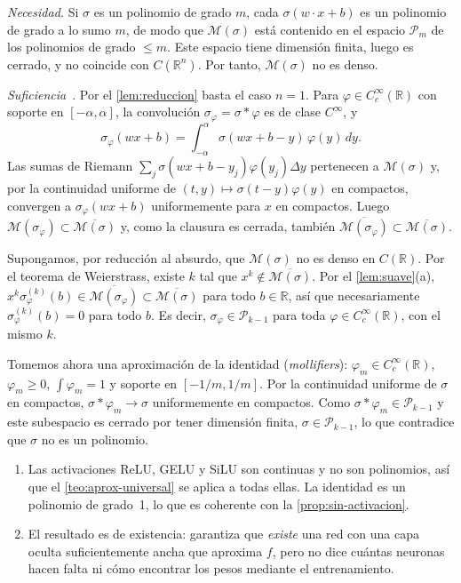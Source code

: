 \begin{demostracion}
\emph{Necesidad.} Si $\sigma$ es un polinomio de grado $m$, cada $\sigma(w\cdot x+b)$ es un polinomio de grado a lo sumo $m$, de modo que $\mathcal{M}(\sigma)$ está contenido en el espacio $\mathcal{P}_m$ de los polinomios de grado $\le m$. Este espacio tiene dimensión finita, luego es cerrado, y no coincide con $C(\mathbb{R}^n)$. Por tanto, $\mathcal{M}(\sigma)$ no es denso.

\emph{Suficiencia}~\cite[prop.~3.7]{pinkus1999approximation}. Por el \cref{lem:reduccion} basta el caso $n=1$. Para $\varphi\in C_c^\infty(\mathbb{R})$ con soporte en $[-\alpha,\alpha]$, la convolución $\sigma_\varphi = \sigma*\varphi$ es de clase $C^\infty$, y
\[
  \sigma_\varphi(wx+b) = \int_{-\alpha}^{\alpha}\sigma(wx+b-y)\,\varphi(y)\,dy.
\]
Las sumas de Riemann $\sum_j \sigma(wx+b-y_j)\varphi(y_j)\Delta y$ pertenecen a $\mathcal{M}(\sigma)$ y, por la continuidad uniforme de $(t,y)\mapsto\sigma(t-y)\varphi(y)$ en compactos, convergen a $\sigma_\varphi(wx+b)$ uniformemente para $x$ en compactos. Luego $\mathcal{M}(\sigma_\varphi)\subset\overline{\mathcal{M}(\sigma)}$ y, como la clausura es cerrada, también $\overline{\mathcal{M}(\sigma_\varphi)}\subset\overline{\mathcal{M}(\sigma)}$.

Supongamos, por reducción al absurdo, que $\mathcal{M}(\sigma)$ no es denso en $C(\mathbb{R})$. Por el teorema de Weierstrass, existe $k$ tal que $x^k\notin\overline{\mathcal{M}(\sigma)}$. Por el \cref{lem:suave}(a), $x^k\sigma_\varphi^{(k)}(b)\in\overline{\mathcal{M}(\sigma_\varphi)}\subset\overline{\mathcal{M}(\sigma)}$ para todo $b\in\mathbb{R}$, así que necesariamente $\sigma_\varphi^{(k)}(b)=0$ para todo $b$. Es decir, $\sigma_\varphi\in\mathcal{P}_{k-1}$ para toda $\varphi\in C_c^\infty(\mathbb{R})$, con el mismo $k$.

Tomemos ahora una aproximación de la identidad (\emph{mollifiers}): $\varphi_m\in C_c^\infty(\mathbb{R})$, $\varphi_m\ge 0$, $\int\varphi_m=1$ y soporte en $[-1/m,1/m]$. Por la continuidad uniforme de $\sigma$ en compactos, $\sigma*\varphi_m\to\sigma$ uniformemente en compactos. Como $\sigma*\varphi_m\in\mathcal{P}_{k-1}$ y este subespacio es cerrado por tener dimensión finita, $\sigma\in\mathcal{P}_{k-1}$, lo que contradice que $\sigma$ no es un polinomio.
\end{demostracion}

\begin{observacion}
\begin{enumerate}
  \item Las activaciones ReLU, GELU y SiLU son continuas y no son polinomios, así que el \cref{teo:aprox-universal} se aplica a todas ellas. La identidad es un polinomio de grado~1, lo que es coherente con la \cref{prop:sin-activacion}.
  \item El resultado es de existencia: garantiza que \emph{existe} una red con una capa oculta suficientemente ancha que aproxima $f$, pero no dice cuántas neuronas hacen falta ni cómo encontrar los pesos mediante el entrenamiento.
\end{enumerate}
\end{observacion}

